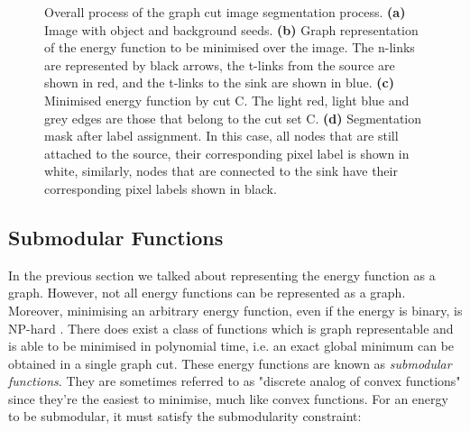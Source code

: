\begin{figure}[!t]
	\centering
	\caption{Overall process of the graph cut image segmentation process.
	\textbf{(a)} Image with object and background seeds.
	\textbf{(b)} Graph representation of the energy function to be minimised over the image. The n-links are represented by black arrows, the t-links from the source are shown in red, and the t-links to the sink are shown in blue.
	\textbf{(c)} Minimised energy function by cut C. The light red, light blue and grey edges are those that belong to the cut set C.
	\textbf{(d)} Segmentation mask after label assignment. In this case, all nodes that are still attached to the source, their corresponding pixel label is shown in white, similarly, nodes that are connected to the sink have their corresponding pixel labels shown in black.}
	\label{fig:graphcut_process}
\end{figure}


\subsection{Submodular Functions}
\label{sec:Submodular Functions}

In the previous section we talked about representing the energy function as a graph. However, not all energy functions can be represented as a graph. Moreover, minimising an arbitrary energy function, even if the energy is binary, is NP-hard \citep{Shimony1994}. There does exist a class of functions which is graph representable and is able to be minimised in polynomial time, i.e. an exact global minimum can be obtained in a single graph cut. These energy functions are known as \textit{submodular functions}. They are sometimes referred to as "discrete analog of convex functions" since they're the easiest to minimise, much like convex functions. For an energy to be submodular, it must satisfy the submodularity constraint:

